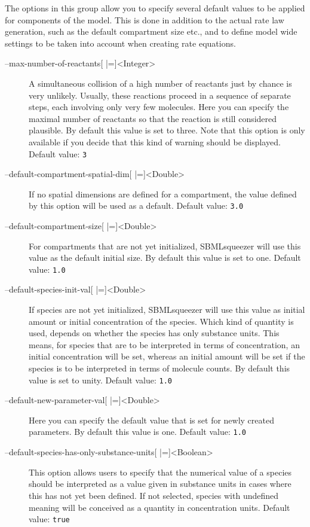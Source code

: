 The options in this group allow you to specify several default values to be
applied for components of the model.
This is done in addition to the actual rate law generation, such as the default
compartment size etc., and to define model wide settings to be taken into
account when creating rate equations.
\begin{description}
\item[--max-number-of-reactants{[} |={]}<Integer>]
  A simultaneous collision of a high number of reactants just by
  chance is very unlikely. Usually, these reactions proceed in
  a sequence of separate steps, each involving only very few molecules.
  Here you can specify the maximal number of reactants so that
  the reaction is still considered plausible. By default this
  value is set to three. Note that this option is only available if
  you decide that this kind of warning should be displayed.
  Default value: \texttt{3}

\item[--default-compartment-spatial-dim{[} |={]}<Double>]
  If no spatial dimensions are defined for a compartment, the value
  defined by this option will be used as a default.
  Default value: \texttt{3.0}

\item[--default-compartment-size{[} |={]}<Double>]
  For compartments that are not yet initialized, SBMLsqueezer will
  use this value as the default initial size. By default this
  value is set to one.
  Default value: \texttt{1.0}

\item[--default-species-init-val{[} |={]}<Double>]
  If species are not yet initialized, SBMLsqueezer will use this
  value as initial amount or initial concentration of the species.
  Which kind of quantity is used, depends on whether the species
  has only substance units. This means, for species that are to
  be interpreted in terms of concentration, an initial concentration
  will be set, whereas an initial amount will be set if the species
  is to be interpreted in terms of molecule counts. By default
  this value is set to unity.
  Default value: \texttt{1.0}

\item[--default-new-parameter-val{[} |={]}<Double>]
  Here you can specify the default value that is set for newly
  created parameters. By default this value is one.
  Default value: \texttt{1.0}

\item[--default-species-has-only-substance-units{[} |={]}<Boolean>]
  This option allows users to specify that the numerical value
  of a species should be interpreted as a value given in substance
  units in cases where this has not yet been defined. If not selected,
  species with undefined meaning will be conceived as a quantity
  in concentration units.
  Default value: \texttt{true}


\end{description}
